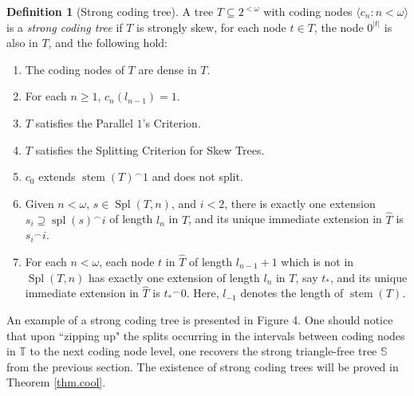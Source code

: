 \documentclass{amsart}
\theoremstyle{remark}
\theoremstyle{definition}
\newtheorem{defn}[thm]{Definition}
\theoremstyle{remark}
\newcommand{\om}{\omega}
\newcommand{\sse}{\subseteq}
\DeclareMathOperator{\stem}{stem}
\DeclareMathOperator{\Spl}{Spl}
\DeclareMathOperator{\spl}{spl}
\newcommand{\bT}{\mathbb{T}}
\newcommand{\bS}{\mathbb{S}}
\newcommand{\lgl}{\langle}
\newcommand{\rgl}{\rangle}
\newcommand{\POC}{Parallel $1$'s Criterion}
\begin{document}
\begin{defn}[Strong  coding tree]\label{def.diagtreeH_3}
A  tree $T\sse 2^{<\om}$ with coding nodes  $\lgl c_n:n<\om\rgl$
 is a {\em   strong coding tree} if
$T$ is strongly skew,
for each node $t\in T$,  the node $0^{|t|}$ is also in $T$, and
the following hold:
\begin{enumerate}
\item
The coding nodes of $T$ are dense in $T$.
\item
For each $n\ge 1$,  $c_n(l_{n-1})=1$.
\item
$T$ satisfies the \POC.
\item
$T$ satisfies the  Splitting Criterion for Skew Trees.
\item
 $c_0$ extends ${\stem(T)}^{\frown}1$ and does not split.
\item
Given $n<\om$, $s\in \Spl(T,n)$, and  $i<2$, there is exactly one extension $s_i\supseteq \spl(s)^{\frown}i$ of length $l_n$ in $T$, and
its unique immediate extension in $\widehat{T}$ is ${s_i}^{\frown}i$.
\item
For each $n<\om$,
each node $t$ in
$\widehat{T}$ of length $l_{n-1}+1$  which is  not in $\Spl(T,n)$
 has exactly one extension of length $l_n$ in $T$,
 say $t_*$,
and its unique immediate extension  in $\widehat{T}$ is ${t_*}^{\frown}0$.
Here, $l_{-1}$ denotes the length of $\stem(T)$.
\end{enumerate}
\end{defn}


An example of a strong coding tree is presented in Figure 4.
One should notice that upon ``zipping up"
 the splits occurring
in the intervals between coding nodes in $\bT$ to the next coding node level,
 one recovers the strong triangle-free tree $\bS$ from the previous section.
The existence of strong coding trees will be proved
 in Theorem \ref{thm.cool}.





\end{document}

